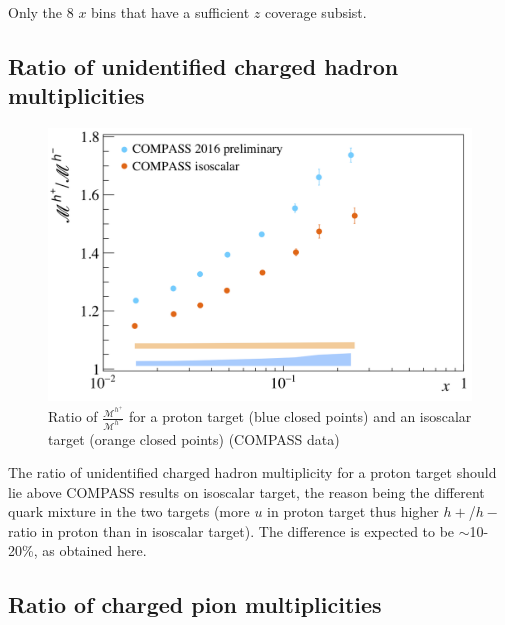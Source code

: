 Only the 8 $x$ bins that have a sufficient $z$ coverage subsist.

\subsection{Ratio of unidentified charged hadron multiplicities}

\begin{figure}[!h]
  \centering
	\includegraphics[scale=0.5]{./gfx/hr.png}
	\caption{Ratio of $\frac{\mathscr{M}^{h^+}}{\mathscr{M}^{h^-}}$ for a proton target (blue closed points) and an isoscalar target (orange closed points) (COMPASS data)}
	\label{pic:hratio}
\end{figure}

The ratio of unidentified charged hadron multiplicity for a proton target should lie above COMPASS results on isoscalar target, the reason being the different quark mixture in the two targets (more $u$ in proton target thus higher $h+$/$h-$ ratio in proton than in isoscalar target). The difference is expected to be $\sim$10-20\%, as obtained here.

\newpage

\subsection{Ratio of charged pion multiplicities}

